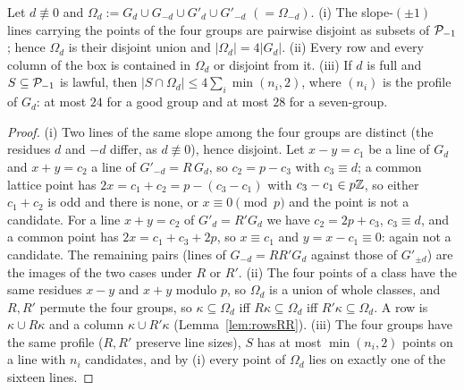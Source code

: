 \begin{lemma}\label{lem:klein}
Let $d\not\equiv0$ and $\Omega_d:=G_d\cup G_{-d}\cup G'_d\cup G'_{-d}$ $(=\Omega_{-d})$.
(i) The slope-$(\pm1)$ lines carrying the points of the four groups are pairwise disjoint as subsets of $\mathcal{P}_{-1}$; hence
$\Omega_d$ is their disjoint union and $|\Omega_d|=4|G_d|$.
(ii) Every row and every column of the box is contained in $\Omega_d$ or disjoint from it.
(iii) If $d$ is full and $S\subseteq\mathcal{P}_{-1}$ is lawful, then $|S\cap\Omega_d|\le4\sum_i\min(n_i,2)$, where $(n_i)$ is the profile of
$G_d$: at most $24$ for a good group and at most $28$ for a seven-group.
\end{lemma}
\begin{proof}
(i) Two lines of the same slope among the four groups are distinct (the residues $d$ and $-d$ differ, as $d\not\equiv0$), hence disjoint.
Let $x-y=c_1$ be a line of $G_d$ and $x+y=c_2$ a line of $G'_{-d}=R\,G_d$, so $c_2=p-c_3$ with $c_3\equiv d$; a common lattice point
has $2x=c_1+c_2=p-(c_3-c_1)$ with $c_3-c_1\in p\mathbb{Z}$, so either $c_1+c_2$ is odd and there is none, or $x\equiv0\pmod p$ and the point is
not a candidate.  For a line $x+y=c_2$ of $G'_d=R'G_d$ we have $c_2=2p+c_3$, $c_3\equiv d$, and a common point has $2x=c_1+c_3+2p$,
so $x\equiv c_1$ and $y=x-c_1\equiv0$: again not a candidate.  The remaining pairs (lines of $G_{-d}=RR'G_d$ against those of
$G'_{\pm d}$) are the images of the two cases under $R$ or $R'$.
(ii) The four points of a class have the same residues $x-y$ and $x+y$ modulo $p$, so $\Omega_d$ is a union of whole classes, and $R,R'$
permute the four groups, so $\kappa\subseteq\Omega_d$ iff $R\kappa\subseteq\Omega_d$ iff $R'\kappa\subseteq\Omega_d$.  A row is
$\kappa\cup R\kappa$ and a column $\kappa\cup R'\kappa$ (Lemma~\ref{lem:rowsRR}).
(iii) The four groups have the same profile ($R,R'$ preserve line sizes), $S$ has at most $\min(n_i,2)$ points on a line with $n_i$
candidates, and by (i) every point of $\Omega_d$ lies on exactly one of the sixteen lines.
\end{proof}

